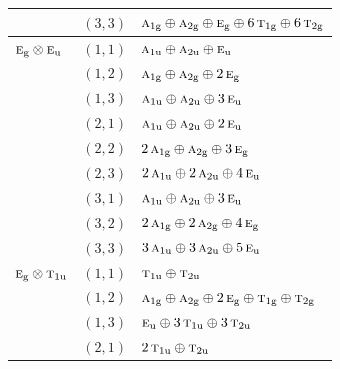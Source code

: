 \documentclass[11pt]{article}
\newcommand{\irr}[1]{\text{\normalfont\scshape #1}}
\newcommand{\ptag}[1]{\mathrm{#1}}
\begin{document}
\begin{longtable}{p{} c p{}}
 & $(3,3)$ & $\irr{a}_{1\ptag{g}}\oplus \irr{a}_{2\ptag{g}}\oplus \irr{e}_{\ptag{g}}\oplus 6\,\irr{t}_{1\ptag{g}}\oplus 6\,\irr{t}_{2\ptag{g}}$\\

\hline

$\irr{e}_{\ptag{g}}\otimes \irr{e}_{\ptag{u}}$ & $(1,1)$ & $\irr{a}_{1\ptag{u}}\oplus \irr{a}_{2\ptag{u}}\oplus \irr{e}_{\ptag{u}}$\\

 & $(1,2)$ & $\irr{a}_{1\ptag{g}}\oplus \irr{a}_{2\ptag{g}}\oplus 2\,\irr{e}_{\ptag{g}}$\\

 & $(1,3)$ & $\irr{a}_{1\ptag{u}}\oplus \irr{a}_{2\ptag{u}}\oplus 3\,\irr{e}_{\ptag{u}}$\\

 & $(2,1)$ & $\irr{a}_{1\ptag{u}}\oplus \irr{a}_{2\ptag{u}}\oplus 2\,\irr{e}_{\ptag{u}}$\\

 & $(2,2)$ & $2\,\irr{a}_{1\ptag{g}}\oplus \irr{a}_{2\ptag{g}}\oplus 3\,\irr{e}_{\ptag{g}}$\\

 & $(2,3)$ & $2\,\irr{a}_{1\ptag{u}}\oplus 2\,\irr{a}_{2\ptag{u}}\oplus 4\,\irr{e}_{\ptag{u}}$\\

 & $(3,1)$ & $\irr{a}_{1\ptag{u}}\oplus \irr{a}_{2\ptag{u}}\oplus 3\,\irr{e}_{\ptag{u}}$\\

 & $(3,2)$ & $2\,\irr{a}_{1\ptag{g}}\oplus 2\,\irr{a}_{2\ptag{g}}\oplus 4\,\irr{e}_{\ptag{g}}$\\

 & $(3,3)$ & $3\,\irr{a}_{1\ptag{u}}\oplus 3\,\irr{a}_{2\ptag{u}}\oplus 5\,\irr{e}_{\ptag{u}}$\\

\hline

$\irr{e}_{\ptag{g}}\otimes \irr{t}_{1\ptag{u}}$ & $(1,1)$ & $\irr{t}_{1\ptag{u}}\oplus \irr{t}_{2\ptag{u}}$\\

 & $(1,2)$ & $\irr{a}_{1\ptag{g}}\oplus \irr{a}_{2\ptag{g}}\oplus 2\,\irr{e}_{\ptag{g}}\oplus \irr{t}_{1\ptag{g}}\oplus \irr{t}_{2\ptag{g}}$\\

 & $(1,3)$ & $\irr{e}_{\ptag{u}}\oplus 3\,\irr{t}_{1\ptag{u}}\oplus 3\,\irr{t}_{2\ptag{u}}$\\

 & $(2,1)$ & $2\,\irr{t}_{1\ptag{u}}\oplus \irr{t}_{2\ptag{u}}$\\


\end{longtable}
\end{document}
